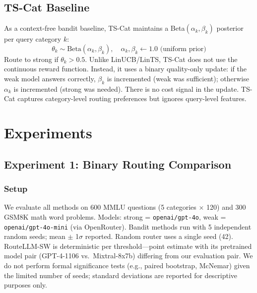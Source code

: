 \documentclass[11pt]{article}
\begin{document}
\subsection{TS-Cat Baseline}
\label{sec:tscat}

As a context-free bandit baseline, TS-Cat maintains a Beta$(\alpha_k, \beta_k)$ posterior per query category $k$:
\begin{equation}
\theta_k \sim \text{Beta}(\alpha_k, \beta_k), \quad \alpha_k, \beta_k \leftarrow 1.0 \text{ (uniform prior)}
\end{equation}
Route to strong if $\theta_k > 0.5$. Unlike LinUCB/LinTS, TS-Cat does not use the continuous reward function. Instead, it uses a binary quality-only update: if the weak model answers correctly, $\beta_k$ is incremented (weak was sufficient); otherwise $\alpha_k$ is incremented (strong was needed). There is no cost signal in the update. TS-Cat captures category-level routing preferences but ignores query-level features.

\section{Experiments}

\subsection{Experiment 1: Binary Routing Comparison}
\label{sec:exp1}

\subsubsection{Setup}

We evaluate all methods on 600 MMLU questions (5 categories $\times$ 120) and 300 GSM8K math word problems. Models: strong = \texttt{openai/gpt-4o}, weak = \texttt{openai/gpt-4o-mini} (via OpenRouter). Bandit methods run with 5 independent random seeds; mean $\pm$ 1$\sigma$ reported. Random router uses a single seed (42). RouteLLM-SW is deterministic per threshold---point estimate with its pretrained model pair (GPT-4-1106 vs.\ Mixtral-8x7b) differing from our evaluation pair. We do not perform formal significance tests (e.g., paired bootstrap, McNemar) given the limited number of seeds; standard deviations are reported for descriptive purposes only.
\end{document}
